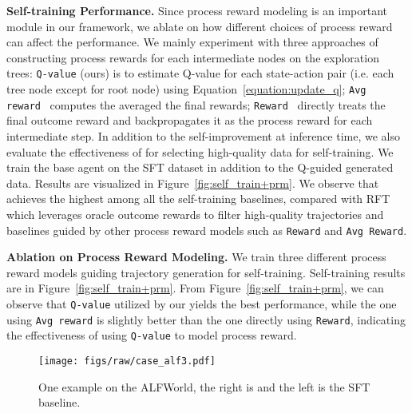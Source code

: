 
\noindent \textbf{Self-training Performance.}
Since process reward modeling is an important module in our framework, we ablate on how different choices of process reward can affect the performance. We mainly experiment with three approaches of constructing process rewards for each intermediate nodes on the exploration trees:
\texttt{Q-value} (ours) is to estimate Q-value for each state-action pair (i.e. each tree node except for root node) using Equation~\ref{equation:update_q}; \texttt{Avg reward}~\citep{math-shepherd} computes the averaged the final rewards; \texttt{Reward}~\citep{yuan2024free} directly treats the final outcome reward and backpropagates it as the process reward for each intermediate step.
In addition to the self-improvement at inference time, we also evaluate the effectiveness of {\ours} for selecting high-quality data for self-training. We train the base agent on the SFT dataset in addition to the Q-guided generated data. Results are visualized in Figure~\ref{fig:self_train+prm}. We observe that {\ours} achieves the highest among all the self-training baselines, compared with RFT which leverages oracle outcome rewards to filter high-quality trajectories and baselines guided by other process reward models such as \texttt{Reward} and \texttt{Avg Reward}.


\noindent \textbf{Ablation on Process Reward Modeling.}
We train three different process reward models guiding trajectory generation for self-training. Self-training results are in Figure~\ref{fig:self_train+prm}. From Figure~\ref{fig:self_train+prm}, we can observe that \texttt{Q-value} utilized by our {\ours} yields the best performance, while the one using \texttt{Avg reward} is slightly better than the one directly using \texttt{Reward}, indicating the effectiveness of using \texttt{Q-value} to model process reward.



\begin{figure*}[htbp]
    \centering
\texttt{[image: figs/raw/case\_alf3.pdf]}
    \vspace{-35pt}
    \caption{One example on the ALFWorld, the right is {\ours} and the left is the SFT baseline.}
    \vspace{-8pt}
    \label{fig:case_alfworld}
\end{figure*}

